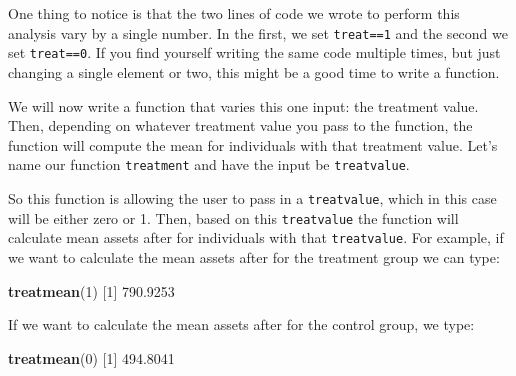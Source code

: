 \documentclass[
]{book}
\newenvironment{Shaded}{\begin{snugshade}}{\end{snugshade}}
\newcommand{\ControlFlowTok}[1]{\textcolor[rgb]{0.13,0.29,0.53}{\textbf{#1}}}
\newcommand{\DecValTok}[1]{\textcolor[rgb]{0.00,0.00,0.81}{#1}}
\newcommand{\FloatTok}[1]{\textcolor[rgb]{0.00,0.00,0.81}{#1}}
\newcommand{\FunctionTok}[1]{\textcolor[rgb]{0.13,0.29,0.53}{\textbf{#1}}}
\newcommand{\NormalTok}[1]{#1}
\newcommand{\OtherTok}[1]{\textcolor[rgb]{0.56,0.35,0.01}{#1}}
\newcommand{\SpecialCharTok}[1]{\textcolor[rgb]{0.81,0.36,0.00}{\textbf{#1}}}
\begin{document}
One thing to notice is that the two lines of code we wrote to perform this analysis vary by a single number. In the first, we set \texttt{treat==1} and the second we set \texttt{treat==0}. If you find yourself writing the same code multiple times, but just changing a single element or two, this might be a good time to write a function.

We will now write a function that varies this one input: the treatment value. Then, depending on whatever treatment value you pass to the function, the function will compute the mean for individuals with that treatment value. Let's name our function \texttt{treatment} and have the input be \texttt{treatvalue}.

\begin{Shaded}
\end{Shaded}

So this function is allowing the user to pass in a \texttt{treatvalue}, which in this case will be either zero or 1. Then, based on this \texttt{treatvalue} the function will calculate mean assets after for individuals with that \texttt{treatvalue}. For example, if we want to calculate the mean assets after for the treatment group we can type:

\begin{Shaded}
\begin{Highlighting}[]
\FunctionTok{treatmean}\NormalTok{(}\DecValTok{1}\NormalTok{)}
\NormalTok{[}\DecValTok{1}\NormalTok{] }\FloatTok{790.9253}
\end{Highlighting}
\end{Shaded}

If we want to calculate the mean assets after for the control group, we type:

\begin{Shaded}
\begin{Highlighting}[]
\FunctionTok{treatmean}\NormalTok{(}\DecValTok{0}\NormalTok{)}
\NormalTok{[}\DecValTok{1}\NormalTok{] }\FloatTok{494.8041}
\end{Highlighting}
\end{Shaded}
\end{document}
